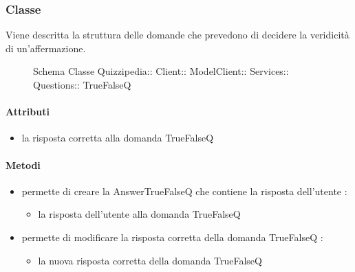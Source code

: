 \subsubsection{Classe }
Viene descritta la struttura delle domande che prevedono di decidere la veridicità di un'affermazione.
\begin{figure}[H]
\centering
\noindent{}
\caption[Schema Classe TrueFalseQ]{Schema Classe Quizzipedia:: Client:: ModelClient:: Services:: Questions:: TrueFalseQ}
\end{figure}
\paragraph{Attributi}
\begin{itemize}
\item {}
\newline
la risposta corretta alla domanda TrueFalseQ
\end{itemize}
\paragraph{Metodi}
\begin{itemize}
\item {}
\newline
permette di creare la AnswerTrueFalseQ che contiene la risposta dell'utente
\newline
{} :
\begin{itemize}
\item {}
\newline
la risposta dell'utente alla domanda TrueFalseQ
\end{itemize}
\item {}
\newline
permette di modificare la risposta corretta della domanda TrueFalseQ
\newline
{} :
\begin{itemize}
\item {}
\newline
la nuova risposta corretta della domanda TrueFalseQ
\end{itemize}
\end{itemize}
